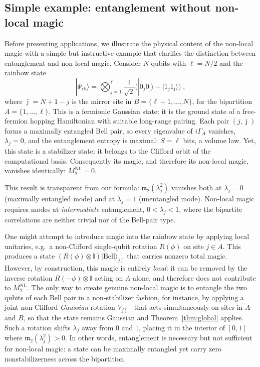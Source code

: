\documentclass[prx,twocolumn,superscriptaddress,aps,10pt, frontmatterverbose, reprint,footinbib,longbibliography=true]{revtex4-2}
\begin{document}
\subsection{Simple example: entanglement without non-local magic}
\label{sec:simple}
Before presenting applications, we illustrate the physical content of the non-local magic with a simple but instructive example that clarifies the distinction between entanglement and non-local magic.
Consider $N$ qubits with $\ell = N/2$ and the rainbow state
\begin{equation}
    |\Psi_{\mathrm{rb}}\rangle = \bigotimes_{j=1}^{\ell} \frac{1}{\sqrt{2}}\bigl(|0_j 0_{\bar\jmath}\rangle + |1_j 1_{\bar\jmath}\rangle\bigr)\;,
\end{equation}
where $\bar\jmath = N+1-j$ is the mirror site in $B=\{\ell+1,\dots,N\}$, for the bipartition $A=\{1,\dots,\ell\}$. This is a fermionic Gaussian state: it is the ground state of a free-fermion hopping Hamiltonian with suitable long-range pairing. Each pair $(j,\bar\jmath)$ forms a maximally entangled Bell pair, so every eigenvalue of $i\Gamma_A$ vanishes, $\lambda_j = 0$, and the entanglement entropy is maximal: $S = \ell$ bits, a volume law. Yet, this state is a stabilizer state: it belongs to the Clifford orbit of the computational basis. Consequently its magic, and therefore its non-local magic, vanishes identically: $M_2^{\mathrm{NL}} = 0$.

This result is transparent from our formula: $\mathfrak{m}_2(\lambda_j^2)$ vanishes both at $\lambda_j = 0$  (maximally entangled mode) and at $\lambda_j = 1$  (unentangled mode). Non-local magic requires modes at \emph{intermediate} entanglement, $0 < \lambda_j < 1$, where the bipartite correlations are neither trivial nor of the Bell-pair type.

One might attempt to introduce magic into the rainbow state by applying local unitaries, e.g.\ a non-Clifford single-qubit rotation $R(\phi)$ on site $j\in A$. This produces a state $(R(\phi)\otimes \mathbb{I})|\mathrm{Bell}\rangle_{j\bar\jmath}$ that carries nonzero total magic. However, by construction, this magic is entirely \emph{local}: it can be removed by the inverse rotation $R(-\phi)\otimes \mathbb{I}$ acting on $A$ alone, and therefore does not contribute to $M_2^{\mathrm{NL}}$. The only way to create genuine non-local magic is to entangle the two qubits of each Bell pair in a non-stabilizer fashion, for instance, by applying a joint non-Clifford \emph{Gaussian} rotation $V_{j\bar\jmath}$~\cite{huang2026dismagickerunitarygatenonstabilizerness} that acts simultaneously on sites in $A$ and $B$, so that the state remains Gaussian and Theorem~\ref{thm:global} applies. Such a rotation shifts $\lambda_j$ away from $0$ and $1$, placing it in the interior of $[0,1]$ where $\mathfrak{m}_2(\lambda_j^2) > 0$. In other words, entanglement is necessary but not sufficient for non-local magic: a state can be maximally entangled yet carry zero nonstabilizerness across the bipartition.
\end{document}
